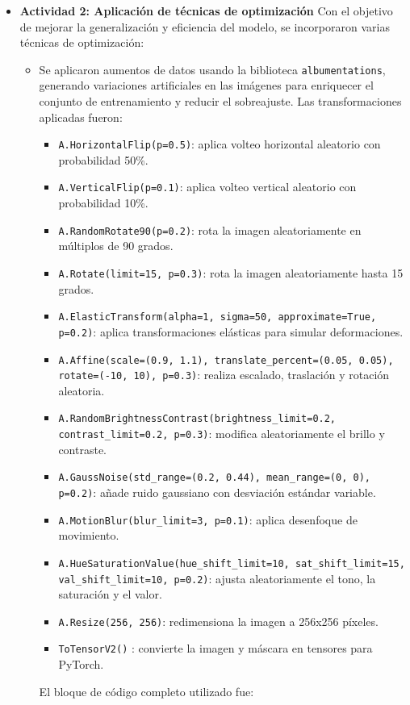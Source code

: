 \begin{enumerate}
\begin{itemize}
  \item\textbf{Actividad 2: Aplicación de técnicas de optimización}
  Con el objetivo de mejorar la generalización y eficiencia del modelo, se incorporaron varias técnicas de optimización:
\begin{itemize}
\item Se aplicaron aumentos de datos usando la biblioteca \texttt{albumentations}, generando variaciones artificiales en las imágenes para enriquecer el conjunto de entrenamiento y reducir el sobreajuste. Las transformaciones aplicadas fueron:
  \begin{itemize}
  \item \texttt{A.HorizontalFlip(p=0.5)}: aplica volteo horizontal aleatorio con probabilidad 50\%.
  \item \texttt{A.VerticalFlip(p=0.1)}: aplica volteo vertical aleatorio con probabilidad 10\%.
  \item \texttt{A.RandomRotate90(p=0.2)}: rota la imagen aleatoriamente en múltiplos de 90 grados.
  \item \texttt{A.Rotate(limit=15, p=0.3)}: rota la imagen aleatoriamente hasta 15 grados.
  \item \texttt{A.ElasticTransform(alpha=1, sigma=50, approximate=True, p=0.2)}: aplica transformaciones elásticas para simular deformaciones.
  \item \texttt{A.Affine(scale=(0.9, 1.1), translate\_percent=(0.05, 0.05), rotate=(-10, 10), p=0.3)}: realiza escalado, traslación y rotación aleatoria.
  \item \texttt{A.RandomBrightnessContrast(brightness\_limit=0.2, contrast\_limit=0.2, p=0.3)}: modifica aleatoriamente el brillo y contraste.
  \item \texttt{A.GaussNoise(std\_range=(0.2, 0.44), mean\_range=(0, 0), p=0.2)}: añade ruido gaussiano con desviación estándar variable.
  \item \texttt{A.MotionBlur(blur\_limit=3, p=0.1)}: aplica desenfoque de movimiento.
  \item \texttt{A.HueSaturationValue(hue\_shift\_limit=10, sat\_shift\_limit=15, val\_shift\_limit=10, p=0.2)}: ajusta aleatoriamente el tono, la saturación y el valor.
  \item \texttt{A.Resize(256, 256)}: redimensiona la imagen a 256x256 píxeles.
  \item \texttt{ToTensorV2()} : convierte la imagen y máscara en tensores para PyTorch.
  \end{itemize}
  El bloque de código completo utilizado fue:
  \begin{lstlisting}[language=Python]

\end{lstlisting}
\end{itemize}
\end{itemize}
\end{enumerate}

